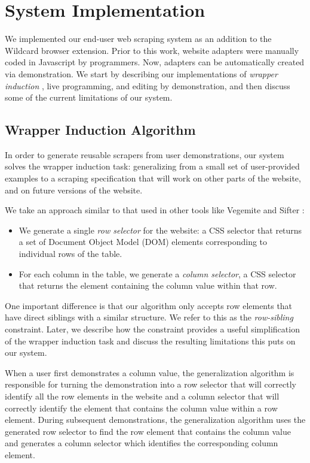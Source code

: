\documentclass[sigconf,10pt]{acmart}
\providecommand{\tightlist}{%
  \setlength{\itemsep}{0pt}\setlength{\parskip}{0pt}}
\begin{document}
\hypertarget{sec:implementation}{%
\section{System Implementation}\label{sec:implementation}}

We implemented our end-user web scraping system as an addition to the
Wildcard browser extension. Prior to this work, website adapters were
manually coded in Javascript by programmers. Now, adapters can be
automatically created via demonstration. We start by describing our
implementations of \emph{wrapper induction} \citep{kushmerick2000}, live
programming, and editing by demonstration, and then discuss some of the
current limitations of our system.

\hypertarget{wrapper-induction-algorithm}{%
\subsection{Wrapper Induction
Algorithm}\label{wrapper-induction-algorithm}}

In order to generate reusable scrapers from user demonstrations, our
system solves the wrapper induction \citep{kushmerick2000} task:
generalizing from a small set of user-provided examples to a scraping
specification that will work on other parts of the website, and on
future versions of the website.

We take an approach similar to that used in other tools like Vegemite
\citep{lin2009} and Sifter \citep{huynh2006}:

\begin{itemize}
\tightlist
\item
  We generate a single \emph{row selector} for the website: a CSS
  selector that returns a set of Document Object Model (DOM) elements
  corresponding to individual rows of the table.
\item
  For each column in the table, we generate a \emph{column selector}, a
  CSS selector that returns the element containing the column value
  within that row.
\end{itemize}

One important difference is that our algorithm only accepts row elements
that have direct siblings with a similar structure. We refer to this as
the \emph{row-sibling} constraint. Later, we describe how the constraint
provides a useful simplification of the wrapper induction task and
discuss the resulting limitations this puts on our system.

When a user first demonstrates a column value, the generalization
algorithm is responsible for turning the demonstration into a row
selector that will correctly identify all the row elements in the
website and a column selector that will correctly identify the element
that contains the column value within a row element. During subsequent
demonstrations, the generalization algorithm uses the generated row
selector to find the row element that contains the column value and
generates a column selector which identifies the corresponding column
element.
\end{document}
